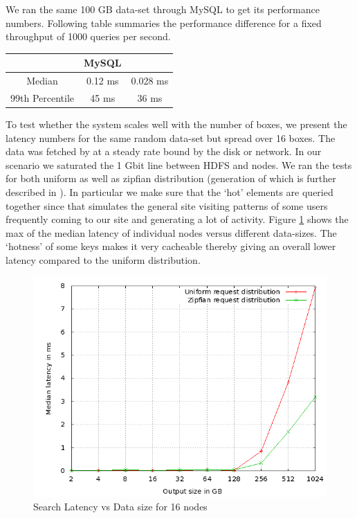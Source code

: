 \documentclass[10pt,twocolumn,preprint,natbib,authoryear]{sigplanconf}
\begin{document}
We ran the same 100 GB data-set through MySQL to get its performance numbers. Following table summaries the performance difference for a fixed throughput of 1000 queries per second. 

\begin{center}
    \begin{tabular}{ | c | c | c |  }
    \hline
     & MySQL & \projectname{} \\ \hline
    Median &   0.12 ms &  0.028	ms \\
	99th Percentile	& 45 ms & 36 ms \\
\hline
    \end{tabular}
\end{center}

To test whether the system scales well with the number of boxes, we present the latency numbers for the same random data-set but spread over 16 boxes. The data was fetched by \projectname{} at a steady rate bound by the disk or network. In our scenario we saturated the 1 Gbit line between HDFS and \projectname{} nodes. We ran the tests for both uniform as well as zipfian distribution (generation of which is further described in \cite{gray}). In particular we make sure that the `hot' elements are queried together since that simulates the general site visiting patterns of some users frequently coming to our site and generating a lot of activity. Figure \ref{16search} shows the max of the median latency of individual nodes versus different data-sizes. The `hotness' of some keys makes it very cacheable thereby giving an overall lower latency compared to the uniform distribution. 

\begin{figure}
  \centering
    \includegraphics[scale=0.35]{images/search_16node.png}
  \caption{Search Latency vs Data size for 16 nodes}
  \label{16search}
\end{figure}
\end{document}
